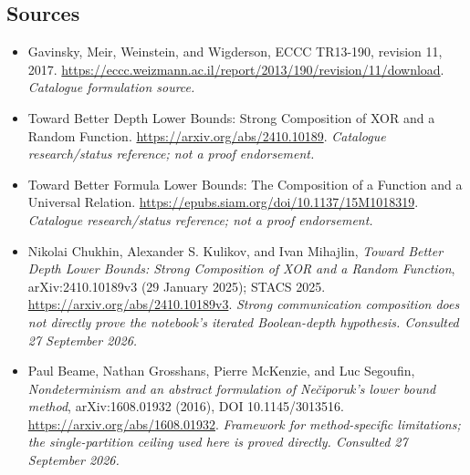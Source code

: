 \documentclass[11pt,a4paper]{article}
\numberwithin{equation}{section}
\begin{document}
\subsection{Sources}
\begin{itemize}\raggedright
\item[\textnormal{[S1]}]\hypertarget{source:30006707:1}{} Gavinsky, Meir, Weinstein, and Wigderson, ECCC TR13-190, revision 11, 2017.
\url{https://eccc.weizmann.ac.il/report/2013/190/revision/11/download}.
{\small\textit{Catalogue formulation source.}}
\item[\textnormal{[S2]}]\hypertarget{source:30006707:2}{} Toward Better Depth Lower Bounds: Strong Composition of XOR and a Random Function.
\url{https://arxiv.org/abs/2410.10189}.
{\small\textit{Catalogue research/status reference; not a proof endorsement.}}
\item[\textnormal{[S3]}]\hypertarget{source:30006707:3}{} Toward Better Formula Lower Bounds: The Composition of a Function and a Universal Relation.
\url{https://epubs.siam.org/doi/10.1137/15M1018319}.
{\small\textit{Catalogue research/status reference; not a proof endorsement.}}

\item[\textnormal{[E1]}]\hypertarget{extra:30006707:1}{} Nikolai Chukhin, Alexander S. Kulikov, and Ivan Mihajlin, \emph{Toward Better Depth Lower Bounds: Strong Composition of XOR and a Random Function}, arXiv:2410.10189v3 (29 January 2025); STACS 2025.
\url{https://arxiv.org/abs/2410.10189v3}.
{\small\textit{Strong communication composition does not directly prove the notebook's iterated Boolean-depth hypothesis. Consulted 27 September 2026.}}
\item[\textnormal{[E2]}]\hypertarget{extra:30006707:2}{} Paul Beame, Nathan Grosshans, Pierre McKenzie, and Luc Segoufin, \emph{Nondeterminism and an abstract formulation of Nečiporuk's lower bound method}, arXiv:1608.01932 (2016), DOI 10.1145/3013516.
\url{https://arxiv.org/abs/1608.01932}.
{\small\textit{Framework for method-specific limitations; the single-partition ceiling used here is proved directly. Consulted 27 September 2026.}}
\end{itemize}
\end{document}
